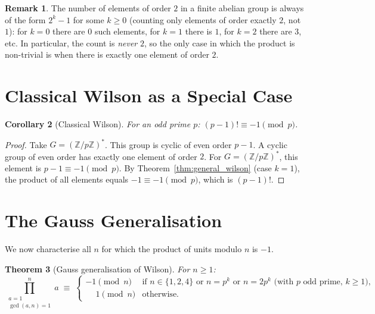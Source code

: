 \documentclass[12pt,a4paper]{amsart}
\newtheorem{theorem}{Theorem}[section]
\newtheorem{corollary}[theorem]{Corollary}
\theoremstyle{definition}
\newtheorem{remark}[theorem]{Remark}
\newcommand{\Z}{\mathbb{Z}}
\begin{document}
\begin{remark}
  The number of elements of order $2$ in a finite abelian group is always
  of the form $2^k - 1$ for some $k \geq 0$ (counting only elements of
  order exactly $2$, not $1$): for $k=0$ there are $0$ such elements, for
  $k=1$ there is $1$, for $k=2$ there are $3$, etc.  In particular, the
  count is \emph{never} $2$, so the only case in which the product is non-trivial
  is when there is exactly one element of order $2$.
\end{remark}

\section{Classical Wilson as a Special Case}

\begin{corollary}[Classical Wilson]\label{cor:classical_wilson}
  For an odd prime $p$: $(p-1)! \equiv -1 \pmod p$.
\end{corollary}

\begin{proof}
  Take $G = (\Z/p\Z)^*$.  This group is cyclic of even order $p-1$.
  A cyclic group of even order has exactly one element of order $2$.
  For $G = (\Z/p\Z)^*$, this element is $p-1 \equiv -1 \pmod p$.
  By Theorem~\ref{thm:general_wilson} (case $k=1$), the product of all
  elements equals $-1 \equiv -1 \pmod p$, which is $(p-1)!$.
\end{proof}

\section{The Gauss Generalisation}

We now characterise all $n$ for which the product of units modulo $n$ is $-1$.

\begin{theorem}[Gauss generalisation of Wilson]\label{thm:gauss}
  For $n \geq 1$:
  \[
    \prod_{\substack{a=1\\\gcd(a,n)=1}}^{n} a
    \;\equiv\;
    \begin{cases}
      -1 \pmod n & \text{if } n \in \{1, 2, 4\}
                   \text{ or } n = p^k \text{ or } n = 2p^k
                   \text{ (with } p \text{ odd prime, } k \geq 1),\\
      \phantom{-}1 \pmod n & \text{otherwise.}
    \end{cases}
  \]
\end{theorem}
\end{document}
